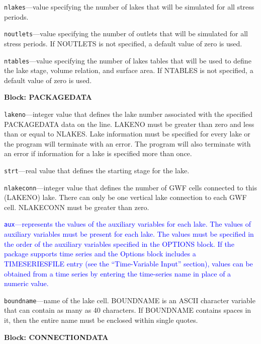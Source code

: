 \begin{description}
\item \texttt{nlakes}---value specifying the number of lakes that will be simulated for all stress periods.

\item \texttt{noutlets}---value specifying the number of outlets that will be simulated for all stress periods. If NOUTLETS is not specified, a default value of zero is used.

\item \texttt{ntables}---value specifying the number of lakes tables that will be used to define the lake stage, volume relation, and surface area. If NTABLES is not specified, a default value of zero is used.

\end{description}
\item \textbf{Block: PACKAGEDATA}

\begin{description}
\item \texttt{lakeno}---integer value that defines the lake number associated with the specified PACKAGEDATA data on the line. LAKENO must be greater than zero and less than or equal to NLAKES. Lake information must be specified for every lake or the program will terminate with an error.  The program will also terminate with an error if information for a lake is specified more than once.

\item \texttt{strt}---real value that defines the starting stage for the lake.

\item \texttt{nlakeconn}---integer value that defines the number of GWF cells connected to this (LAKENO) lake. There can only be one vertical lake connection to each GWF cell. NLAKECONN must be greater than zero.

\item \textcolor{blue}{\texttt{aux}---represents the values of the auxiliary variables for each lake. The values of auxiliary variables must be present for each lake. The values must be specified in the order of the auxiliary variables specified in the OPTIONS block.  If the package supports time series and the Options block includes a TIMESERIESFILE entry (see the ``Time-Variable Input'' section), values can be obtained from a time series by entering the time-series name in place of a numeric value.}

\item \texttt{boundname}---name of the lake cell.  BOUNDNAME is an ASCII character variable that can contain as many as 40 characters.  If BOUNDNAME contains spaces in it, then the entire name must be enclosed within single quotes.

\end{description}
\item \textbf{Block: CONNECTIONDATA}

